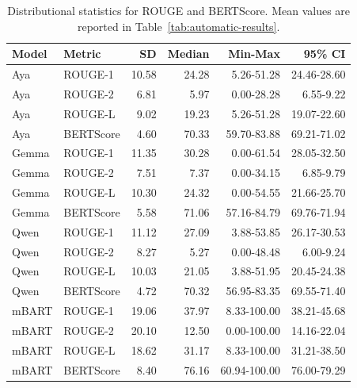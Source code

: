 \documentclass[11pt]{article}
\begin{document}
\begin{table}[t]
\centering
\scriptsize
\setlength{\tabcolsep}{5pt}
\begin{tabular}{llrrrr}
\hline
Model & Metric & SD & Median & Min-Max & 95\% CI \\
\hline
Aya   & ROUGE-1   & 10.58 & 24.28 & 5.26-51.28   & 24.46-28.60 \\
Aya   & ROUGE-2   & 6.81  & 5.97  & 0.00-28.28   & 6.55-9.22 \\
Aya   & ROUGE-L   & 9.02  & 19.23 & 5.26-51.28   & 19.07-22.60 \\
Aya   & BERTScore & 4.60  & 70.33 & 59.70-83.88  & 69.21-71.02 \\
Gemma & ROUGE-1   & 11.35 & 30.28 & 0.00-61.54   & 28.05-32.50 \\
Gemma & ROUGE-2   & 7.51  & 7.37  & 0.00-34.15   & 6.85-9.79 \\
Gemma & ROUGE-L   & 10.30 & 24.32 & 0.00-54.55   & 21.66-25.70 \\
Gemma & BERTScore & 5.58  & 71.06 & 57.16-84.79  & 69.76-71.94 \\
Qwen  & ROUGE-1   & 11.12 & 27.09 & 3.88-53.85   & 26.17-30.53 \\
Qwen  & ROUGE-2   & 8.27  & 5.27  & 0.00-48.48   & 6.00-9.24 \\
Qwen  & ROUGE-L   & 10.03 & 21.05 & 3.88-51.95   & 20.45-24.38 \\
Qwen  & BERTScore & 4.72  & 70.32 & 56.95-83.35  & 69.55-71.40 \\
mBART & ROUGE-1   & 19.06 & 37.97 & 8.33-100.00  & 38.21-45.68 \\
mBART & ROUGE-2   & 20.10 & 12.50 & 0.00-100.00  & 14.16-22.04 \\
mBART & ROUGE-L   & 18.62 & 31.17 & 8.33-100.00  & 31.21-38.50 \\
mBART & BERTScore & 8.40  & 76.16 & 60.94-100.00 & 76.00-79.29 \\
\hline
\end{tabular}
\caption{Distributional statistics for ROUGE and BERTScore. Mean values are reported in Table~\ref{tab:automatic-results}.}
\label{tab:reference-metric-distributions}
\end{table}
\end{document}
